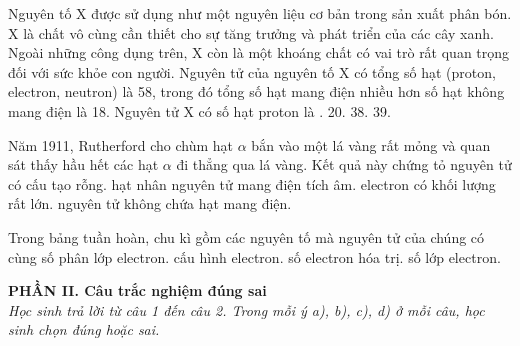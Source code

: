 \documentclass[11pt,a4paper]{article}
\begin{document}
\begin{ex}
Nguyên tố X được sử dụng như một nguyên liệu cơ bản trong sản xuất phân bón. X là chất vô cùng cần thiết cho sự tăng trưởng và phát triển của các cây xanh. Ngoài những công dụng trên, X còn là một khoáng chất có vai trò rất quan trọng đối với sức khỏe con người. Nguyên tử của nguyên tố X có tổng số hạt (proton, electron, neutron) là 58, trong đó tổng số hạt mang điện nhiều hơn số hạt không mang điện là 18. Nguyên tử X có số hạt proton là
\choice
{.}
{20.}
{38.}
{39.}

\end{ex}
\begin{ex}
Năm 1911, Rutherford cho chùm hạt $\alpha$ bắn vào một lá vàng rất mỏng và quan sát thấy hầu hết các hạt $\alpha$ đi thẳng qua lá vàng. Kết quả này chứng tỏ
\choice
{\True nguyên tử có cấu tạo rỗng.}
{hạt nhân nguyên tử mang điện tích âm.}
{electron có khối lượng rất lớn.}
{nguyên tử không chứa hạt mang điện.}

\end{ex}
\begin{ex}
Trong bảng tuần hoàn, chu kì gồm các nguyên tố mà nguyên tử của chúng có cùng
\choice
{số phân lớp electron.}
{cấu hình electron.}
{số electron hóa trị.}
{\True số lớp electron.}

\end{ex}
\vspace{4pt}
\noindent
{\color{mainGreen}\textbf{\large PHẦN II. Câu trắc nghiệm đúng sai}}\\
\textit{\small Học sinh trả lời từ câu 1 đến câu 2. Trong mỗi ý a), b), c), d) ở mỗi câu, học sinh chọn đúng hoặc sai.}
\vspace{2pt}
\end{document}
